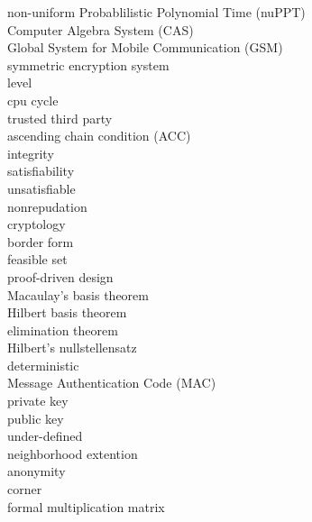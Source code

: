 \begin{latin}
non-uniform Probablilistic Polynomial Time (nuPPT)\dotfill {}\\
Computer Algebra System (CAS)\dotfill {}\\
Global System for Mobile Communication (GSM)\dotfill {}\\
symmetric encryption system\dotfill {}\\
level\dotfill {}\\
cpu cycle\dotfill {}\\
trusted third party\dotfill {}\\
ascending chain condition (ACC)\dotfill {}\\
integrity\dotfill {}\\
satisfiability\dotfill {}\\
unsatisfiable\dotfill {}\\
nonrepudation\dotfill {}\\
cryptology\dotfill {}\\
border form\dotfill {}\\
feasible set\dotfill {}\\
proof-driven design\dotfill {}\\
Macaulay’s basis theorem\dotfill {}\\
Hilbert basis theorem\dotfill {}\\
elimination theorem\dotfill {}\\
Hilbert’s nullstellensatz\dotfill {}\\
deterministic\dotfill {}\\
Message Authentication Code (MAC)\dotfill {}\\
private key\dotfill {}\\
public key\dotfill {}\\
under-defined\dotfill {}\\
neighborhood extention\dotfill {}\\
anonymity\dotfill {}\\
corner\dotfill {}\\
formal multiplication matrix\dotfill {}\\

\end{latin}
